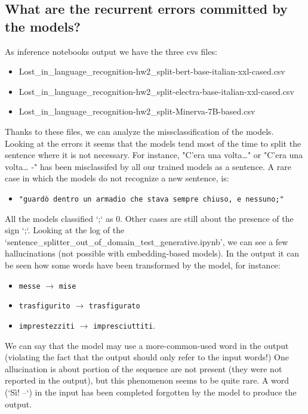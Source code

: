 \documentclass[11pt]{article}
\begin{document}
\subsection{What are the recurrent errors committed by the models?}
As inference notebooks output we have the three cvs files:
\begin{itemize}
 	\item Lost\_in\_language\_recognition-hw2\_split-bert-base-italian-xxl-cased.csv
	\item Lost\_in\_language\_recognition-hw2\_split-electra-base-italian-xxl-cased.csv
	\item Lost\_in\_language\_recognition-hw2\_split-Minerva-7B-based.csv
\end{itemize}
Thanks to these files, we can analyze the missclassification of the models. \newline Looking at the errors it seems that the models tend most of the time to split the sentence where it is not necessary. \newline For instance, "C'era una volta…" or "C'era una volta… -" has been misclassifed by all our trained models as a sentence. \newpage
A rare case in which the models do not recognize a new sentence, is: 
\begin{itemize}
    \item \texttt{"guardò dentro un armadio che stava sempre
chiuso, e nessuno;"}
\end{itemize}
All the models classified `;` as 0. \newline Other cases are still about
the presence of the sign `;`. \newline Looking at the log of the `sentence\_splitter\_out\_of\_domain\_test\_generative.ipynb', we can see a few hallucinations (not possible with embedding-based models). \newline In the output it can be seen how some words have been transformed by the model, for instance:
\begin{itemize}
    \item \texttt{messe} $\rightarrow$ \texttt{mise}
    \item \texttt{trasfigurito} $\rightarrow$ \texttt{trasfigurato}
    \item \texttt{imprestezziti} $\rightarrow$ \texttt{impresciuttiti}.
\end{itemize} 
We can say that the model may use a more-common-used word in the output (violating the fact that the output should only refer to the input words!) \newline One allucination is about portion of the sequence are not present (they were not reported in the output), but this phenomenon seems to be quite rare. \newline A word (`Sì! –`) in the input has been completed forgotten by the model to produce the output.
\end{document}

